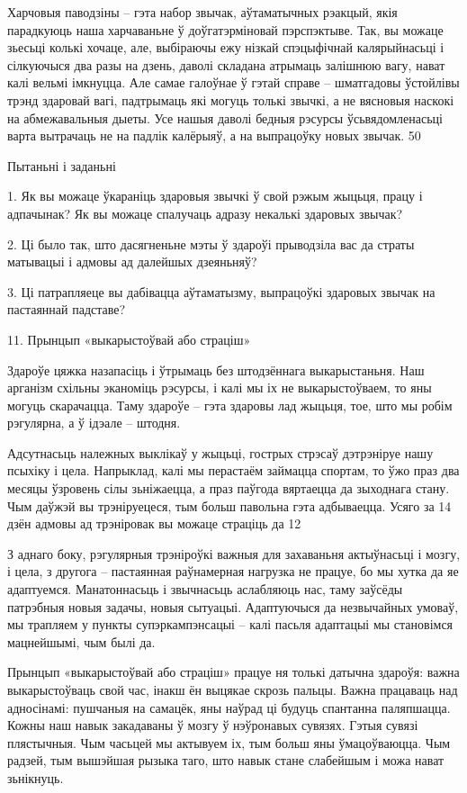 Харчовыя паводзіны – гэта набор звычак, аўтаматычных рэакцый, якія парадкуюць наша харчаваньне ў доўгатэрміновай пэрспэктыве. Так, вы можаце зьесьці колькі хочаце, але, выбіраючы ежу нізкай спэцыфічнай калярыйнасьці і сілкуючыся два разы на дзень, даволі складана атрымаць залішнюю вагу, нават калі вельмі імкнуцца. Але самае галоўнае ў гэтай справе – шматгадовы ўстойлівы трэнд здаровай вагі, падтрымаць які могуць толькі звычкі, а не вясновыя наскокі на абмежавальныя дыеты. Усе нашыя даволі бедныя рэсурсы ўсьвядомленасьці варта вытрачаць не на падлік калёрыяў, а на выпрацоўку новых звычак. 50%

Пытаньні і заданьні

1. Як вы можаце ўкараніць здаровыя звычкі ў свой рэжым жыцьця, працу і адпачынак? Як вы можаце спалучаць адразу некалькі здаровых звычак?

2. Ці было так, што дасягненьне мэты ў здароўі прыводзіла вас да страты матывацыі і адмовы ад далейшых дзеяньняў?

3. Ці патрапляеце вы дабівацца аўтаматызму, выпрацоўкі здаровых звычак на пастаяннай падставе?


11. Прынцып «выкарыстоўвай або страціш»

Здароўе цяжка назапасіць і ўтрымаць без штодзённага выкарыстаньня. Наш арганізм схільны эканоміць рэсурсы, і калі мы іх не выкарыстоўваем, то яны могуць скарачацца. Таму здароўе – гэта здаровы лад жыцьця, тое, што мы робім рэгулярна, а ў ідэале – штодня.

Адсутнасьць належных выклікаў у жыцьці, гострых стрэсаў дэтрэніруе нашу псыхіку і цела. Напрыклад, калі мы перастаём займацца спортам, то ўжо праз два месяцы ўзровень сілы зьніжаецца, а праз паўгода вяртаецца да зыходнага стану. Чым даўжэй вы трэніруецеся, тым больш павольна гэта адбываецца. Усяго за 14 дзён адмовы ад трэніровак вы можаце страціць да 12%

З аднаго боку, рэгулярныя трэніроўкі важныя для захаваньня актыўнасьці і мозгу, і цела, з другога – пастаянная раўнамерная нагрузка не працуе, бо мы хутка да яе адаптуемся. Манатоннасьць і звычнасьць аслабляюць нас, таму заўсёды патрэбныя новыя задачы, новыя сытуацыі. Адаптуючыся да незвычайных умоваў, мы трапляем у пункты супэркампэнсацыі – калі пасьля адаптацыі мы становімся мацнейшымі, чым былі да.

Прынцып «выкарыстоўвай або страціш» працуе ня толькі датычна здароўя: важна выкарыстоўваць свой час, інакш ён выцякае скрозь пальцы. Важна працаваць над адносінамі: пушчаныя на самацёк, яны наўрад ці будуць спантанна паляпшацца. Кожны наш навык закадаваны ў мозгу ў нэўронавых сувязях. Гэтыя сувязі плястычныя. Чым часьцей мы актывуем іх, тым больш яны ўмацоўваюцца. Чым радзей, тым вышэйшая рызыка таго, што навык стане слабейшым і можа нават зьнікнуць.

